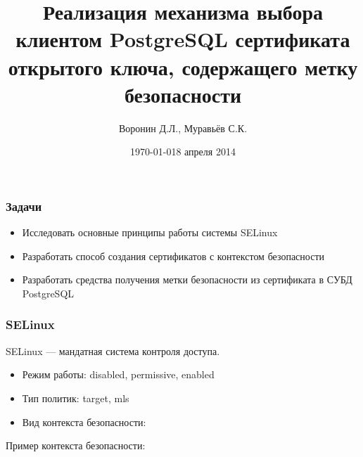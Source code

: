\documentclass[xcolor={dvipsnames,table}]{beamer}
\date{\today}
\title[]{Реализация механизма выбора клиентом PostgreSQL сертификата открытого ключа, содержащего метку безопасности}
\date{8 апреля 2014}
\author{Воронин Д.Л., Муравьёв С.К.}
\begin{document}
\frame{\titlepage}




\begin{frame}
 \frametitle{Задачи}
  


\begin{itemize}
  \item Исследовать основные принципы работы системы SELinux
  \item Разработать способ создания сертификатов с контекстом безопасности
  \item Разработать средства получения метки безопасности из сертификата в СУБД PostgreSQL
\end{itemize}

  
\end{frame}
\begin{frame}
 \frametitle{SELinux}
  


SELinux --- мандатная система контроля доступа.

\vspace{ 1em }

\begin{itemize}
  \item Режим работы: disabled, permissive, enabled
  \item Тип политик: target, mls
  \item Вид контекста безопасности:

\oeoecjnhimgdibjgdhicjejomppjljle

\end{itemize}


\vspace{ 1em }

Пример контекста безопасности:

\hphcedkmnkififhjegdolhelnmpkoaah



  
\end{frame}
\end{document}
